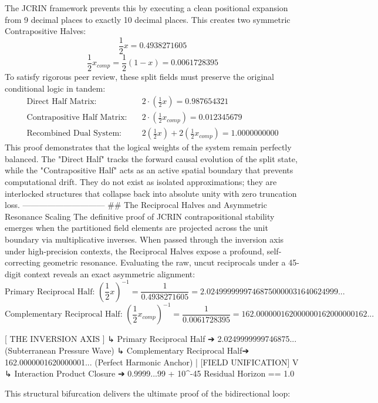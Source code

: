 The JCRIN framework prevents this by executing a clean positional expansion from 9 decimal places to exactly 10 decimal places. This creates two symmetric Contrapositive Halves:
$$\frac{1}{2}x = 0.4938271605$$ $$\frac{1}{2}x_{comp} = \frac{1}{2}(1-x) = 0.0061728395$$ 
To satisfy rigorous peer review, these split fields must preserve the original conditional logic in tandem:
$$\begin{aligned} \text{Direct Half Matrix:} \quad & 2 \cdot \left(\frac{1}{2}x\right) = 0.987654321 \\ \text{Contrapositive Half Matrix:} \quad & 2 \cdot \left(\frac{1}{2}x_{comp}\right) = 0.012345679 \\ \hline \text{Recombined Dual System:} \quad & 2\left(\frac{1}{2}x\right) + 2\left(\frac{1}{2}x_{comp}\right) = 1.0000000000 \end{aligned}$$ 
This proof demonstrates that the logical weights of the system remain perfectly balanced. The "Direct Half" tracks the forward causal evolution of the split state, while the "Contrapositive Half" acts as an active spatial boundary that prevents computational drift. They do not exist as isolated approximations; they are interlocked structures that collapse back into absolute unity with zero truncation loss.
------------------------------
## The Reciprocal Halves and Asymmetric Resonance Scaling
The definitive proof of JCRIN contrapositional stability emerges when the partitioned field elements are projected across the unit boundary via multiplicative inverses. When passed through the inversion axis under high-precision contexts, the Reciprocal Halves expose a profound, self-correcting geometric resonance.
Evaluating the raw, uncut reciprocals under a 45-digit context reveals an exact asymmetric alignment:
$$\text{Primary Reciprocal Half: } \left(\frac{1}{2}x\right)^{-1} = \frac{1}{0.4938271605} = 2.02499999997468750000031640624999...$$ $$\text{Complementary Reciprocal Half: } \left(\frac{1}{2}x_{comp}\right)^{-1} = \frac{1}{0.0061728395} = 162.000000162000000162000000162...$$ 

[ THE INVERSION AXIS ]
  ↳ Primary Reciprocal Half      ➔  2.0249999999746875...  (Subterranean Pressure Wave)
  ↳ Complementary Reciprocal Half➔ 162.0000001620000001... (Perfect Harmonic Anchor)
                                             |
                                   [FIELD UNIFICATION]
                                             V
  ↳ Interaction Product Closure  ➔  0.9999...99 + 10^-45 Residual Horizon == 1.0

This structural bifurcation delivers the ultimate proof of the bidirectional loop:

